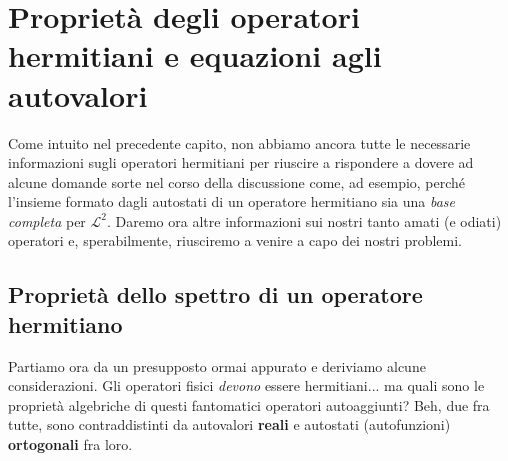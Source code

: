 
\chapter{Proprietà degli operatori hermitiani e equazioni agli autovalori}
Come intuito nel precedente capito, non abbiamo ancora tutte le necessarie informazioni sugli operatori hermitiani per riuscire a rispondere a dovere ad alcune domande sorte nel corso della discussione come, ad esempio, perché l'insieme formato dagli autostati di un operatore hermitiano sia una \emph{base completa} per $\mathcal{L}^2$. Daremo ora altre informazioni sui nostri tanto amati (e odiati) operatori e, sperabilmente, riusciremo a venire a capo dei nostri problemi.

\section{Proprietà dello spettro di un operatore hermitiano}
Partiamo ora da un presupposto ormai appurato e deriviamo alcune considerazioni. Gli operatori fisici \emph{devono} essere hermitiani... ma quali sono le proprietà algebriche di questi fantomatici operatori autoaggiunti? Beh, due fra tutte, sono contraddistinti da autovalori \textbf{reali} e autostati (autofunzioni) \textbf{ortogonali} fra loro. 

